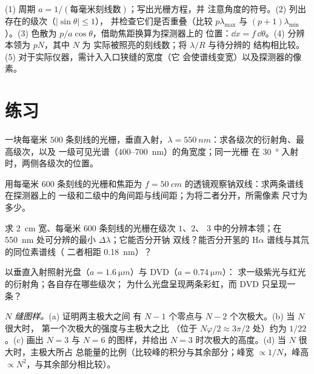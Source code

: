 \begin{method}[光栅计算]\label{met:b2:gratings:method}
(1) 周期 $a = 1/(\text{每毫米刻线数})$；写出光栅方程，并
注意角度的符号。(2) 列出存在的级次（$|\sin\theta| \le 1$），
并检查它们是否重叠（比较 $p\lambda_{\max}$ 与 $(p + 1)\lambda_{\min}$）。(3)
色散为 $p/a\cos\theta$，借助焦距换算为探测器上的
位置：$\dd x = f\,\dd\theta$。(4) 分辨本领为 $pN$，其中 $N$ 为
实际被照亮的刻线数；将 $\lambda/R$ 与待分辨的
结构相比较。(5) 对于实际仪器，需计入入口狭缝的宽度（它
会使谱线变宽）以及探测器的像素。
\end{method}

\section{练习}

\begin{exercise}[$\star$]\label{exo:b2:gratings:1}
一块每毫米 $500$ 条刻线的光栅，垂直入射，$\lambda =
\qty{550}{nm}$：求各级次的衍射角、最高级次，以及
一级可见光谱（$400$--\qty{700}{nm}）的角宽度；同一光栅
在 \qty{30}{\degree} 入射时，两侧各级次的位置。
\end{exercise}

\begin{exercise}[$\star$]\label{exo:b2:gratings:2}
用每毫米 $600$ 条刻线的光栅和焦距为 $f =
\qty{50}{cm}$ 的透镜观察钠双线：求两条谱线在探测器上的
一级和二级中的角间距与线间距；为将二者分开，所需像素
尺寸为多少。
\end{exercise}

\begin{exercise}[$\star$]\label{exo:b2:gratings:3}
求 \qty{2}{cm} 宽、每毫米 $600$ 条刻线的光栅在级次 $1$、$2$、
$3$ 中的分辨本领；在 \qty{550}{nm} 处可分辨的最小 $\Delta\lambda$；它能否分开钠
双线？能否分开氢的 H$\alpha$ 谱线与其氘的同位素谱线（
二者相距 \qty{0.18}{nm}）？
\end{exercise}

\begin{exercise}[$\star$]\label{exo:b2:gratings:4}
以垂直入射照射光盘（$a = \qty{1.6}{\micro m}$）与 DVD（$a = \qty{0.74}{\micro m}$）：
求一级紫光与红光的衍射角；各自存在哪些级次；
为什么光盘呈现两条彩虹，而 DVD 只呈现一条？
\end{exercise}

\begin{exercise}[$\star\star$]\label{exo:b2:gratings:5}
\emph{$N$ 缝图样。}(a) 证明两主极大之间
有 $N - 1$ 个零点与 $N - 2$ 个次极大。(b) 当 $N$ 很大时，
第一个次极大的强度与主极大之比
（位于 $N\varphi/2 \approx 3\pi/2$ 处）约为 $1/22$。(c) 画出
$N = 3$ 与 $N = 6$ 的图样，并给出
$N = 3$ 时次极大的高度。(d) 当 $N$ 很大时，主极大所占
总能量的比例（比较峰的积分与其余部分；峰宽 $\propto 1/N$，峰高
$\propto N^2$，与其余部分相比较）。
\end{exercise}

